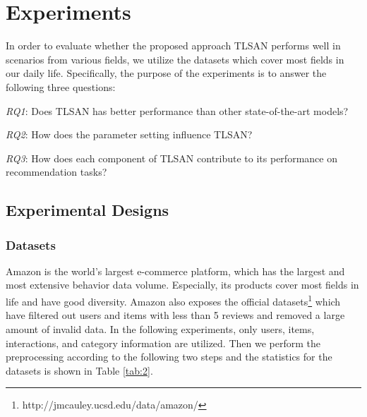 \documentclass[preprint,12pt]{elsarticle}
\newcommand{\tool}{TLSAN\xspace}
\begin{document}
\begin{sloppypar}
\section{Experiments}
\label{sec_experiments}

In order to evaluate whether the proposed approach \tool performs well in scenarios from various fields, we utilize the datasets which cover most fields in our daily life. Specifically, the purpose of the experiments is to answer the following three questions:

\emph{RQ1}: Does \tool has better performance than other state-of-the-art models?

\emph{RQ2}: How does the parameter setting influence \tool?

\emph{RQ3}: How does each component of \tool contribute to its performance on recommendation tasks?

\subsection{Experimental Designs}
\subsubsection{Datasets}

Amazon is the world's largest e-commerce platform, which has the largest and most extensive behavior data volume. Especially, its products cover most fields in life and have good diversity. Amazon also exposes the official datasets\footnote{http://jmcauley.ucsd.edu/data/amazon/} which have filtered out users and items with less than 5 reviews and removed a large amount of invalid data. In the following experiments, only users, items, interactions, and category information are utilized. Then we perform the preprocessing according to the following two steps and the statistics for the datasets is shown in Table \ref{tab:2}.


\end{sloppypar}
\end{document}
